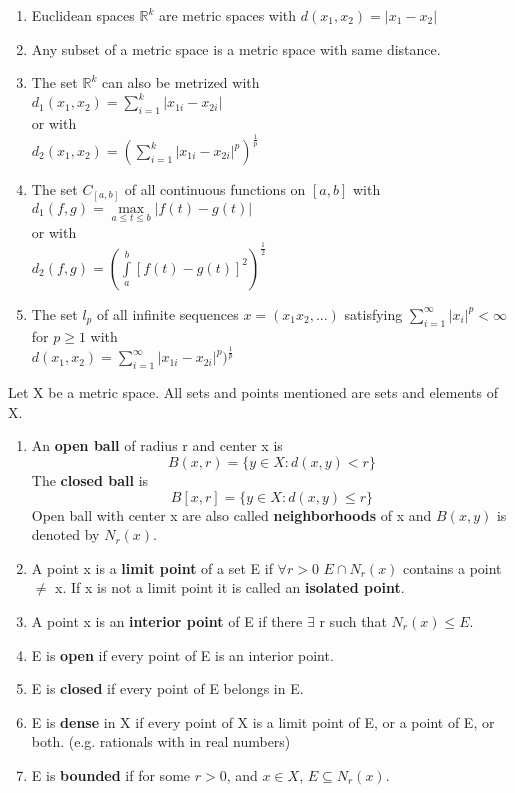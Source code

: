 \documentclass[11pt,fleqn]{book} %
\begin{document}
\begin{example}
	\begin{enumerate}[label = \alph*)]
		\item Euclidean spaces $\mathbb{R}^k$ are metric spaces with $d(x_1, x_2) = |x_1 - x_2|$
		\item Any subset of a metric space is a metric space with same distance.
		\item The set $\mathbb{R}^k$ can also be metrized with\\
			$d_1(x_1, x_2) = \sum\limits_{i=1}^k |x_{1i}-x_{2i} |$\\
			or with\\
			$d_2(x_1, x_2) = (\sum\limits_{i=1}^k |x_{1i}-x_{2i} |^p)^{\frac{1}{p}}$
		\item The set $C_{[a,b]}$ of all continuous functions on $[a,b]$ with\\
			$d_1(f,g) = \max\limits_{a \le t \le b} |f(t) - g(t)| $\\
			or with \\
			$d_2(f,g)= (\int\limits_a^b [f(t)-g(t)]^2)^{\frac{1}{2}} $
		\item The set $l_p$ of all infinite sequences $x= (x_1 x_2, \dots)$ satisfying $\sum\limits_{i=1}^\infty|x_i|^p < \infty$ for $p \ge 1$ with\\
		$d(x_1, x_2) = \sum\limits_{i=1}^\infty |x_{1i}-x_{2i} |^p)^{\frac{1}{p}}$

	\end{enumerate}
\end{example}

\begin{definition}
	Let X be a metric space. All sets and points mentioned are sets and elements of X.

	\begin{enumerate}[label = \alph*)]
		\item An \textbf{open ball} of radius r and center x is
			$$B(x,r) = \{y \in X: d(x,y) <r\} $$
			The \textbf{closed ball} is
			$$B[x,r] = \{y \in X: d(x,y) \le r\}  $$
			Open ball with center x are also called \textbf{neighborhoods} of x and $B(x,y)$ is denoted by $N_r(x)$.
		\item A point x is a \textbf{limit point} of a set E if $\forall r >0$ $E \cap N_r(x) $ 	contains a point $\neq$ x. If x is not a limit point it is called an \textbf{isolated 	  point}.
		\item A point x is an \textbf{interior point} of E if there $\exists$ r such that $N_r(x)\le E$.
		\item E is \textbf{open} if every point of E is an interior point.
		\item E is \textbf{closed} if every point of E belongs in E.
		\item E is \textbf{dense} in X if every point of X is a limit point of E, or a point of E, or both. (e.g. rationals with in real numbers)
		\item E is \textbf{bounded} if for some $r>0$, and $x \in X$, $E \subseteq N_r(x)$.
	\end{enumerate}

\end{definition}
\end{document}

